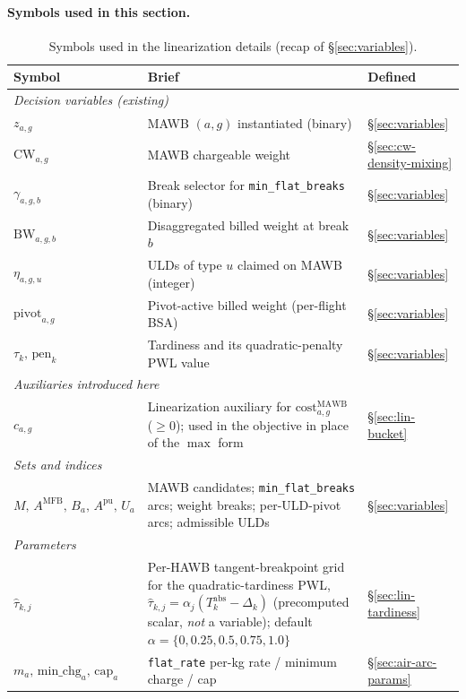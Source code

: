 \documentclass[11pt,a4paper]{article}
\theoremstyle{definition}
\begin{document}
\paragraph{Symbols used in this section.}
\begin{table}[H]
\centering
\caption{Symbols used in the linearization details (recap of \S\ref{sec:variables}).}
\label{tab:linearization-syms}
\begin{tabular}{lp{9cm}p{3.5cm}}
\toprule
Symbol & Brief & Defined \\
\midrule
\multicolumn{3}{l}{\textit{Decision variables (existing)}} \\
$z_{a,g}$ & MAWB $(a, g)$ instantiated (binary) & \S\ref{sec:variables} \\
$\text{CW}_{a,g}$ & MAWB chargeable weight & \S\ref{sec:cw-density-mixing} \\
$\gamma_{a,g,b}$ & Break selector for \texttt{min\_flat\_breaks} (binary) & \S\ref{sec:variables} \\
$\text{BW}_{a,g,b}$ & Disaggregated billed weight at break $b$ & \S\ref{sec:variables} \\
$\eta_{a,g,u}$ & ULDs of type $u$ claimed on MAWB (integer) & \S\ref{sec:variables} \\
$\text{pivot}_{a,g}$ & Pivot-active billed weight (per-flight BSA) & \S\ref{sec:variables} \\
$\tau_k,\, \text{pen}_k$ & Tardiness and its quadratic-penalty PWL value & \S\ref{sec:variables} \\
\multicolumn{3}{l}{\textit{Auxiliaries introduced here}} \\
$c_{a,g}$ & Linearization auxiliary for $\text{cost}^{\text{MAWB}}_{a,g}$ ($\geq 0$); used in the objective in place of the $\max$ form & \S\ref{sec:lin-bucket} \\
\midrule
\multicolumn{3}{l}{\textit{Sets and indices}} \\
$M,\, A^{\text{MFB}},\, B_a,\, A^{\text{pu}},\, U_a$ & MAWB candidates; \texttt{min\_flat\_breaks} arcs; weight breaks; per-ULD-pivot arcs; admissible ULDs & \S\ref{sec:variables} \\
\midrule
\multicolumn{3}{l}{\textit{Parameters}} \\
$\hat\tau_{k,j}$ & Per-HAWB tangent-breakpoint grid for the quadratic-tardiness PWL, $\hat\tau_{k,j} = \alpha_j (T_k^{\text{abs}} - \Delta_k)$ (precomputed scalar, \emph{not} a variable); default $\alpha = \{0, 0.25, 0.5, 0.75, 1.0\}$ & \S\ref{sec:lin-tardiness} \\
$m_a,\, \text{min\_chg}_a,\, \text{cap}_a$ & \texttt{flat\_rate} per-kg rate / minimum charge / cap & \S\ref{sec:air-arc-params} \\

\end{tabular}
\end{table}
\end{document}
